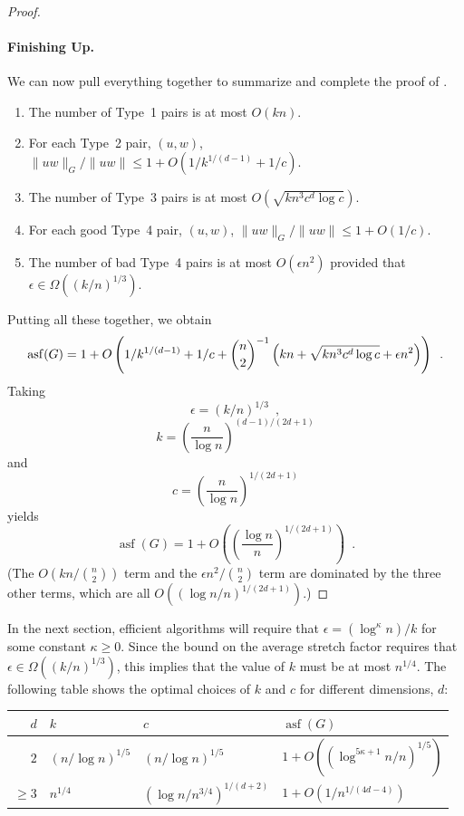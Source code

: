 \documentclass{patmorin}
\DeclareMathOperator{\asf}{asf}
\begin{document}
\begin{proof}
  \paragraph{Finishing Up.}
  We can now pull everything together to summarize and complete the proof
  of .
  \begin{enumerate}
    \item The number of Type~1 pairs is at most $O(kn)$.
    \item For each Type~2 pair, $(u,w)$, 
      $\|uw\|_G/\|uw\|\le 1+ O(1/k^{1/(d-1)}+1/c)$.
    \item The number of Type~3 pairs is at most
      $O(\sqrt{kn^{3}c^{d}\log c})$.
    \item For each good Type~4 pair, $(u,w)$, 
      $\|uw\|_G/\|uw\|\le 1+ O(1/c)$.
    \item The number of bad Type~4 pairs is at most 
       $O(\epsilon n^2)$ provided that $\epsilon \in \Omega((k/n)^{1/3})$.
  \end{enumerate}
  Putting all these together, we obtain
  \begin{equation}\eqlabel{master-asf}
     \asf(G) = 1 + O\left(1/k^{1/(d-1)} + 1/c 
       + \binom{n}{2}^{-1}\left(kn+\sqrt{kn^{3}c^{d}\log c}
             +\epsilon n^2\right)\right) \enspace .
  \end{equation}
  Taking 
  \[ 
       \epsilon = (k/n)^{1/3} \enspace ,
  \]
  \[ 
       k = \left(\frac{n}{\log n}\right)^{(d-1)/(2d+1)}
  \]
  and
  \[
       c = \left(\frac{n}{\log n}\right)^{1/(2d+1)}
  \]
  yields
  \[
     \asf(G) = 1+ O\left(\left(\frac{\log n}{n}\right)^{1/(2d+1)}\right) \enspace .
  \]
  (The $O(kn/\binom{n}{2})$ term and the $\epsilon n^2/\binom{n}{2}$
  term are dominated by the three other terms, which are all $O((\log
  n/n)^{1/(2d+1)})$.)
\end{proof}

\begin{rem}
   In the next section, efficient algorithms will require that
   $\epsilon = (\log^\kappa n)/k$ for some constant $\kappa \ge 0$.
   Since the bound on the average stretch factor requires that
   $\epsilon\in\Omega((k/n)^{1/3})$, this implies that the value of $k$
   must be at most $n^{1/4}$.  The following table shows the optimal
   choices of $k$ and $c$ for different dimensions, $d$:

   \begin{center}
   \renewcommand\arraystretch{1.3} %
     \begin{tabular}{|r|l|l|l|}
        \hline
        $d$ & $k$ & $c$ & $\asf(G)$ \\\hline\hline
        $2$ & $(n/\log n)^{1/5}$ & $(n/\log n)^{1/5}$ 
              & $1+ O((\log^{5\kappa+1} n/n)^{1/5})$ \\
        $\ge 3$ & $n^{1/4}$ & $(\log n/n^{3/4})^{1/(d+2)}$ 
              & $1+ O(1/n^{1/(4d-4)})$ \\
     \hline
     \end{tabular}
   \end{center}
\end{rem}
\end{document}
